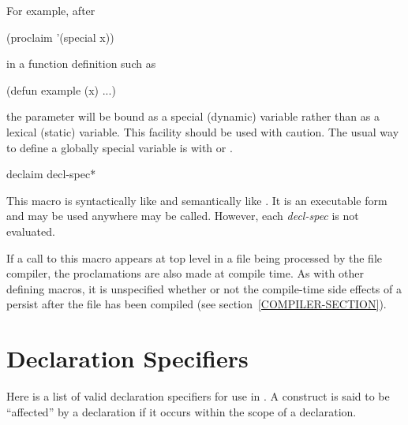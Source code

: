 \begin{defun}[Function]
For example, after
\begin{lisp}
(proclaim '(special x))
\end{lisp}
in a function definition such as
\begin{lisp}
(defun example (x) ...)
\end{lisp}
the parameter  will be bound as a special (dynamic) variable
rather than as a lexical (static) variable.  This facility should
be used with caution.  The usual way to define a globally special
variable is with  or .
\end{defun}

\begin{defmac}
declaim {decl-spec}*

This macro is syntactically like  and semantically
like .  It is an executable form and may be used
anywhere  may be called.  However, each \emph{decl-spec}
is not evaluated.

If a call to this macro appears at top level in a file
being processed by the file compiler, the proclamations are also
made at compile time.  As with other defining macros, it is 
unspecified whether or not the compile-time side effects of a 
 persist after the file has been compiled
(see section~\ref{COMPILER-SECTION}).
\end{defmac}

\section{Declaration Specifiers}
\label{DECLARATION-SPECIFIERS-SECTION}

Here is a list of valid declaration specifiers for use in
.  A construct is said to be ``affected'' by a declaration
if it occurs within the scope of a declaration.

